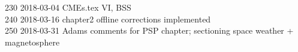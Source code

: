 \begin{footnotesize}
230	2018-03-04	CMEs.tex VI, BSS\\
240	2018-03-16	chapter2 offline corrections implemented\\
250	2018-03-31	Adams comments for PSP chapter; sectioning space weather + magnetosphere\\

\end{footnotesize}
